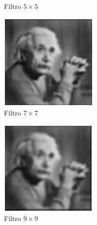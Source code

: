 \documentclass[a4paper, 12pt]{article}
\begin{document}
\begin{enumerate}
\begin{figure}[!htb]
		  \caption{Filtro $5 \times 5$}
		\endminipage\hspace{1cm}
		  \includegraphics[scale=0.62]{images/borrado7.jpg}
		  \caption{Filtro $7 \times 7$}
		\endminipage
	\end{figure}

	\begin{figure}[!htb]
		\centering
		  \includegraphics[width=\linewidth]{images/borrado9.jpg}
		  \caption{Filtro $9 \times 9$}
		\endminipage\hspace{1cm}

\end{figure}
\end{enumerate}
\end{document}
